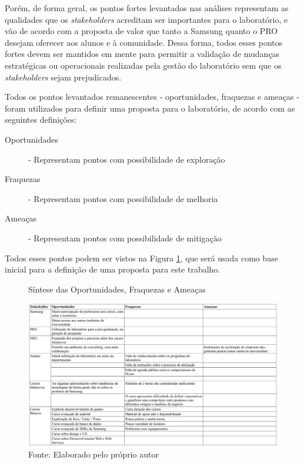 Porém, de forma geral, os pontos fortes levantados nas análises representam as qualidades que os \textit{stakeholders} acreditam ser importantes para o laboratório, e vão de acordo com a proposta de valor que tanto a Samsung quanto o PRO desejam oferecer aos alunos e à comunidade. Dessa forma, todos esses pontos fortes devem ser mantidos em mente para permitir a validação de mudanças estratégicas ou operacionais realizadas pela gestão do laboratório sem que os \textit{stakeholders} sejam prejudicados.

Todos os pontos levantados remanescentes - oportunidades, fraquezas e ameaças - foram utilizados para definir uma proposta para o laboratório, de acordo com as seguintes definições:

\begin{description}
\item[Oportunidades] - Representam pontos com possibilidade de exploração
\item[Fraquezas] - Representam pontos com possibilidade de melhoria
\item[Ameaças] - Representam pontos com possibilidade de mitigação
\end{description}

Todos esses pontos podem ser vistos na Figura  \ref{fig:oportunidadesfraquezasameacas}, que será usada como base inicial para a definição de uma proposta para este trabalho. 

\begin{landscape}

\begin{figure}
\caption{Síntese das Oportunidades, Fraquezas e Ameaças}
\centerline{\includegraphics[scale=0.6]{img/oportunidadesfraquezasameacas}}
\label{fig:oportunidadesfraquezasameacas}
\caption* {Fonte: Elaborado pelo próprio autor}
\end{figure}

\end{landscape}

